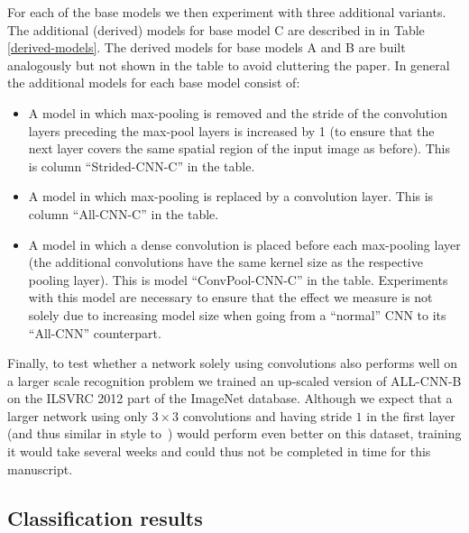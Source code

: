 \documentclass{article} \usepackage{iclr2015,times}
\begin{document}
For each of the base models we then experiment with three additional variants. The additional (derived) models for base model C are described in in Table \ref{derived-models}. The derived models for base models A and B are built analogously but not shown in the table to avoid cluttering the paper. 
In general the additional models for each base model consist of:
\begin{itemize}
  \item A model in which max-pooling is removed and the stride of the convolution layers
preceding the max-pool layers is increased by 1 (to ensure that the
next layer covers the same spatial region of the input image as
before). This is column ``Strided-CNN-C'' in the table.  
  \item A model in which max-pooling is replaced by a convolution
    layer. This is column ``All-CNN-C'' in the table.
  \item A model in which a dense convolution is placed before each
    max-pooling layer (the additional convolutions have the same kernel size as
    the respective pooling layer). This is model ``ConvPool-CNN-C'' in
    the table. Experiments with this model are necessary to ensure
    that the effect we measure is not solely due to increasing model
    size when going from a ``normal'' CNN to its ``All-CNN'' counterpart.
\end{itemize}

Finally, to test whether a network solely using convolutions also
performs well on a larger scale recognition problem we trained an
up-scaled version of ALL-CNN-B on the ILSVRC 2012 part of the ImageNet
database. Although we
expect that a larger network using only $3 \times 3$ convolutions and having stride $1$ in the first layer (and 
thus similar in style to~\citet{VGG_2014}) would perform even
better on this dataset, training it would take several weeks 
and could thus not be completed in time for this manuscript.

\subsection{Classification results}
\end{document}
